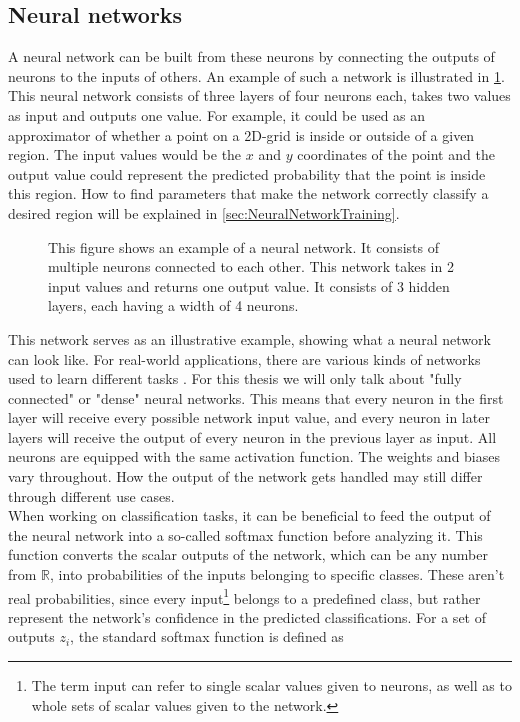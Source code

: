 \subsection{Neural networks}\label{sec:NeuralNetworks}
A neural network can be built from these neurons by connecting the outputs of neurons to the inputs of others. An example of such a network is illustrated in \cref{fig:Neural_network_example}. This neural network consists of three layers of four neurons each, takes two values as input and outputs one value. For example, it could be used as an approximator of whether a point on a 2D-grid is inside or outside of a given region. The input values would be the $x$ and $y$ coordinates of the point and the output value could represent the predicted probability that the point is inside this region. How to find parameters that make the network correctly classify a desired region will be explained in \cref{sec:NeuralNetworkTraining}.\\
\begin{figure}
	\centering
	
	\caption{This figure shows an example of a neural network. It consists of multiple neurons connected to each other. This network takes in 2 input values and returns one output value. It consists of 3 hidden layers, each having a width of 4 neurons.}
	\label{fig:Neural_network_example}
\end{figure}
This network serves as an illustrative example, showing what a neural network can look like. For real-world applications, there are various kinds of networks used to learn different tasks \cite{DeepLearningTaxonomy}. For this thesis we will only talk about "fully connected" or "dense" neural networks. This means that every neuron in the first layer will receive every possible network input value, and every neuron in later layers will receive the output of every neuron in the previous layer as input. All neurons are equipped with the same activation function. The weights and biases vary throughout. How the output of the network gets handled may still differ through different use cases. \\
When working on classification tasks, it can be beneficial to feed the output of the neural network into a so-called softmax function before analyzing it. This function converts the scalar outputs of the network, which can be any number from $\mathbb{R}$, into probabilities of the inputs belonging to specific classes. These aren't real probabilities, since every input\footnote{The term input can refer to single scalar values given to neurons, as well as to whole sets of scalar values given to the network.} belongs to a predefined class, but rather represent the network's confidence in the predicted classifications. For a set of outputs $z_i$, the standard softmax function is defined as 
